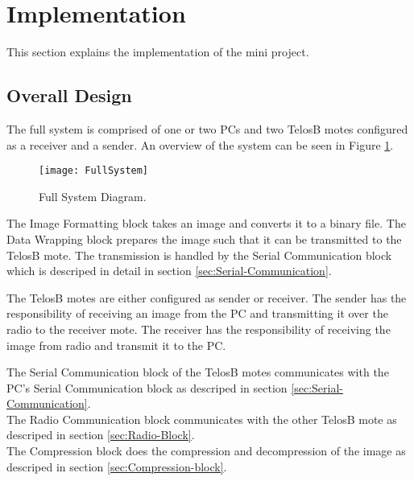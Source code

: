\section{Implementation}
This section explains the implementation of the mini project.

\subsection{Overall Design}
The full system is comprised of one or two PCs and two TelosB motes configured as a receiver and a sender. An overview of the system can be seen in Figure \ref{FullSystem}.

\begin{figure}[H]
	\centering
	\texttt{[image: FullSystem]}
	\caption{Full System Diagram.}
	\label{FullSystem}
\end{figure}

The Image Formatting block takes an image and converts it to a binary file.
The Data Wrapping block prepares the image such that it can be transmitted to the TelosB mote.
The transmission is handled by the Serial Communication block which is descriped in detail in section \ref{sec:Serial-Communication}.

The TelosB motes are either configured as sender or receiver.  The sender has the responsibility of receiving an image from the PC and transmitting it over the radio to the receiver mote. The receiver has the responsibility of receiving the image from radio and transmit it to the PC.

The Serial Communication block of the TelosB motes communicates with the PC's Serial Communication block as descriped in section \ref{sec:Serial-Communication}.\\
The Radio Communication block communicates with the other TelosB mote as descriped in section \ref{sec:Radio-Block}. \\
The Compression block does the compression and decompression of the image as descriped in section \ref{sec:Compression-block}.

